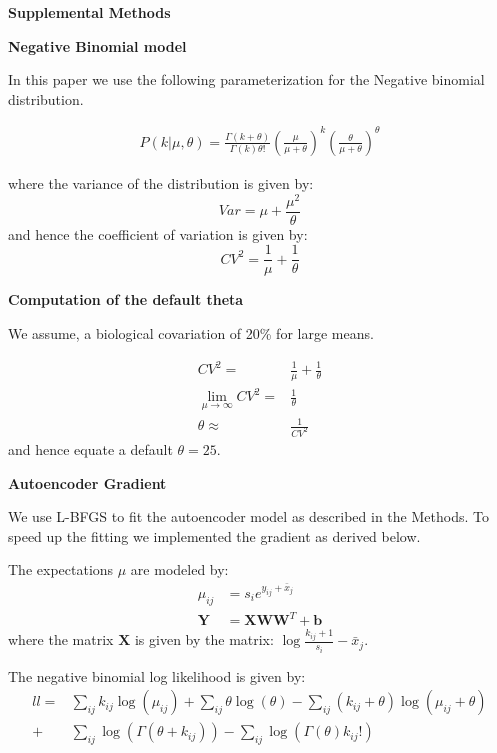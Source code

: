 \documentclass[11pt]{letter}
\newcommand{\matr}[1]{\mathbf{#1}}
\begin{document}
\textbf{Supplemental Methods}

\textbf{Negative Binomial model}

In this paper we use the following parameterization for the Negative binomial distribution.

\begin{align*}
P(k| \mu, \theta) = \frac{\Gamma(k + \theta)}{\Gamma(k) \theta!}  
\left ( \frac{\mu}{\mu + \theta} \right )^{k}
\left ( \frac{\theta}{\mu + \theta} \right)^{\theta} 
\end{align*}

where the variance of the distribution is given by:
\[
Var = \mu + \frac{\mu^2}{\theta}
\]
and hence the coefficient of variation is given by:
\[
CV^2 = \frac{1}{\mu} + \frac{1}{\theta}
\]


\textbf{Computation of the default theta}

We assume, a biological covariation of 20\% for large means.

\begin{align*}
CV^2 =& \frac{1}{\mu} + \frac{1}{\theta}\\
\lim_{\mu \to \infty} CV^2 =& \frac{1}{\theta}\\
\theta \approx& \frac{1}{CV^2}
\end{align*}
and hence equate a default $\theta = 25$.





\textbf{Autoencoder Gradient}

We use L-BFGS to fit the autoencoder model as described in the Methods.
To speed up the fitting we implemented the gradient as derived below.

The expectations $\mu$ are modeled by:
\begin{align*}
\mu_{ij} &= s_{i} e^{y_{ij} + \bar{x}_j}\\
\matr{Y} &= \matr{X} \matr{W} \matr{W}^T + \matr{b}
\end{align*}
where the matrix $\matr{X}$ is given by the matrix: $\log{\frac{k_{ij}+1}{s_i}} - \bar{x}_j$. 

The negative binomial log likelihood is given by:
\begin{align*}
ll=& \sum_{ij} k_{ij} \log{(\mu_{ij})} + 
\sum_{ij} \theta \log{(\theta)} -
\sum_{ij} (k_{ij} + \theta) \log{(\mu_{ij} + \theta)} \\
+&\sum_{ij} \log{(\Gamma(\theta + k_{ij}))} 
- \sum_{ij} \log{(\Gamma({\theta}) k_{ij}!)}
\end{align*}
\end{document}
